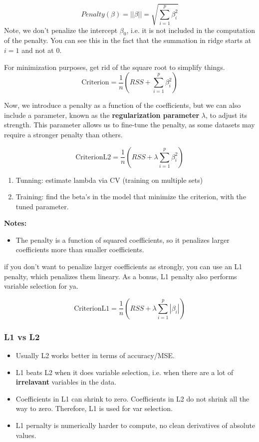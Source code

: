 \documentclass{article}
\begin{document}
\[ Penalty(\beta) = ||\beta|| = \sqrt{\sum_{i=1}^p \beta_i^2}\]
Note, we don't penalize the intercept $\beta_0$, i.e. it is not included in the computation of the penalty. You can see this in the fact that the summation in ridge starts at $i=1$ and not at 0.

For minimization purposes, get rid of the square root to simplify things. \\
\[ \text{Criterion} = 
\frac{1}{n}
( RSS + \sum_{i=1}^p \beta_i^2 )
\]

Now, we introduce a penalty as a function of the coefficients, but we can also include a parameter, known as the \textbf{regularization parameter} $\lambda$, to adjust its strength. This parameter allows us to fine-tune the penalty, as some datasets may require a stronger penalty than others.

\[ \text{CriterionL2} = 
\frac{1}{n}
( RSS +  \lambda \sum_{i=1}^p \beta_i^2 )
\]

\begin{enumerate}
\item Tunning: estimate lambda via CV (training on multiple sets)
\item Training: find the beta's in the model that minimize the criterion, with the tuned parameter.
\end{enumerate}

\textbf{Notes:}
\begin{itemize}
\item The penalty is a function of squared coefficients, so it penalizes larger coefficients more than smaller coefficients. 
\end{itemize}

if you don't want to penalize larger coefficients as strongly, you can use an L1 penalty, which penalizes them lineary. As a bonus, L1 penalty also performs variable selection for ya. 

\[ \text{CriterionL1} = 
\frac{1}{n}
( RSS +  \lambda \sum_{i=1}^p |\beta_i| )
\]

\subsubsection{L1 vs L2}
\begin{itemize}
\item Usually L2 works better in terms of accuracy/MSE.
\item L1 beats L2 when it does variable selection, i.e. when there are a lot of \textbf{irrelavant} variables in the data. 
\item Coefficients in L1 can shrink to zero. Coefficients in L2 do not shrink all the way to zero. Therefore, L1 is used for var selection.
\item L1 pernalty is numerically harder to compute, no clean derivatives of absolute values. 
\end{itemize}
\end{document}
